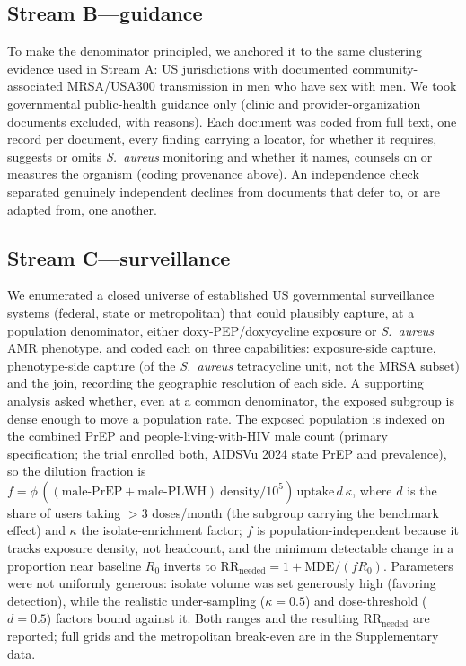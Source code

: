 \documentclass[12pt,a4paper]{article}
\newcommand{\sa}{\emph{S.~aureus}}
\begin{document}
\subsection*{Stream B---guidance}
To make the denominator principled, we anchored it to the same clustering
evidence used in Stream A: US jurisdictions with documented community-associated
MRSA/USA300 transmission in men who have sex with men.\cite{dejong2025,diep2008}
We took governmental public-health guidance only (clinic and
provider-organization documents excluded, with reasons). Each document was coded
from full text, one record per document, every finding carrying a locator, for
whether it requires, suggests or omits \sa{} monitoring and whether it names,
counsels on or measures the organism (coding provenance above). An independence
check separated genuinely independent declines from documents that defer to, or
are adapted from, one another.

\subsection*{Stream C---surveillance}
We enumerated a closed universe of established US governmental surveillance
systems (federal, state or metropolitan) that could plausibly capture, at a
population denominator, either doxy-PEP/doxycycline exposure or \sa{} AMR
phenotype, and coded each on three capabilities: exposure-side capture,
phenotype-side capture (of the \sa{} tetracycline unit, not the MRSA subset) and
the join, recording the geographic resolution of each side. A supporting analysis
asked whether, even at a common denominator, the exposed subgroup is dense enough
to move a population rate. The exposed population is indexed on the combined PrEP
and people-living-with-HIV male count (primary specification; the trial enrolled
both, AIDSVu 2024 state PrEP and prevalence), so the dilution fraction is
$f=\phi\,((\text{male-PrEP}+\text{male-PLWH})\ \text{density}/10^{5})\,\text{uptake}\,d\,\kappa$,
where $d$ is the share of users taking $>$3 doses/month (the subgroup carrying the
benchmark effect) and $\kappa$ the isolate-enrichment factor; $f$ is
population-independent
because it tracks exposure density, not headcount, and the minimum detectable
change in a proportion near baseline $R_0$ inverts to
$\mathrm{RR_{needed}}=1+\mathrm{MDE}/(f R_0)$. Parameters were not uniformly
generous: isolate volume was set generously high (favoring detection), while the
realistic under-sampling ($\kappa=0.5$) and dose-threshold ($d=0.5$) factors bound
against it. Both ranges and the resulting $\mathrm{RR_{needed}}$ are reported;
full grids and the metropolitan break-even are in the Supplementary data.
\end{document}
